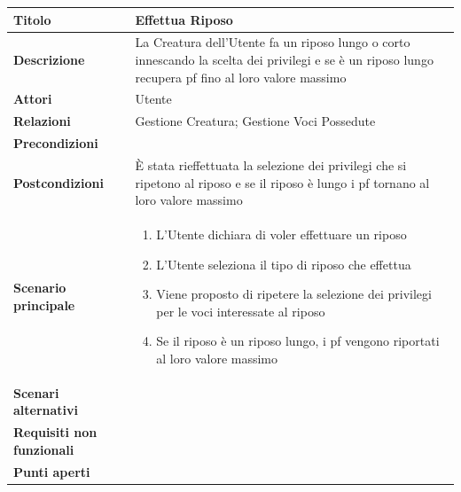 \documentclass[a4paper, 11pt]{article}
\begin{document}
\begin{center}
\begin{tabular}{ |p{5cm}|p{9.5cm}|  }
\hline
\textbf{Titolo} & Effettua Riposo \\
\hline
\textbf{Descrizione} & La Creatura dell'Utente fa un riposo lungo o corto innescando la scelta dei privilegi e se è un riposo lungo recupera pf fino al loro valore massimo \\
\hline
\textbf{Attori} & Utente \\
\hline
\textbf{Relazioni} & Gestione Creatura; Gestione Voci Possedute \\
\hline
\textbf{Precondizioni} & \\
\hline
\textbf{Postcondizioni} & È stata rieffettuata la selezione dei privilegi che si ripetono al riposo e se il riposo è lungo i pf tornano al loro valore massimo\\
\hline
\textbf{Scenario principale} & 
\begin{enumerate}
    \item L'Utente dichiara di voler effettuare un riposo
    \item L'Utente seleziona il tipo di riposo che effettua
    \item Viene proposto di ripetere la selezione dei privilegi per le voci interessate al riposo
    \item Se il riposo è un riposo lungo, i pf vengono riportati al loro valore massimo
\end{enumerate}\\
\hline
\textbf{Scenari alternativi} & \\
\hline
\textbf{Requisiti non funzionali} & \\
\hline
\textbf{Punti aperti} & \\
\hline
\end{tabular}

\vspace{3em}


\end{center}
\end{document}
